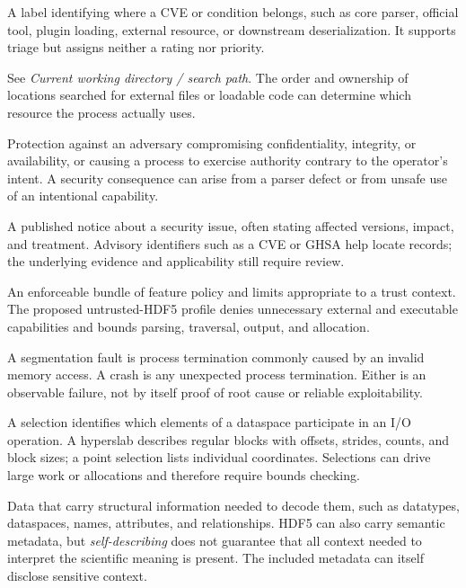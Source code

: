 \documentclass[../main.tex]{subfiles}
\begin{document}
\begin{description}[leftmargin=1.5em,style=nextline]
\item[Scope tag.]
A label identifying where a CVE or condition belongs, such as core parser,
official tool, plugin loading, external resource, or downstream
deserialization. It supports triage but assigns neither a rating nor priority.

\item[Search path.]
See \emph{Current working directory / search path}. The order and ownership of
locations searched for external files or loadable code can determine which
resource the process actually uses.

\item[Security.]
Protection against an adversary compromising confidentiality, integrity, or
availability, or causing a process to exercise authority contrary to the
operator's intent. A security consequence can arise from a parser defect or
from unsafe use of an intentional capability.

\item[Security advisory.]
A published notice about a security issue, often stating affected versions,
impact, and treatment. Advisory identifiers such as a CVE or GHSA help locate
records; the underlying evidence and applicability still require review.

\item[Security profile.]
An enforceable bundle of feature policy and limits appropriate to a trust
context. The proposed untrusted-HDF5 profile denies unnecessary external and
executable capabilities and bounds parsing, traversal, output, and allocation.

\item[Segmentation fault / crash.]
A segmentation fault is process termination commonly caused by an invalid
memory access. A crash is any unexpected process termination. Either is an
observable failure, not by itself proof of root cause or reliable
exploitability.

\item[Selection / hyperslab / point selection.]
A selection identifies which elements of a dataspace participate in an I/O
operation. A hyperslab describes regular blocks with offsets, strides, counts,
and block sizes; a point selection lists individual coordinates. Selections
can drive large work or allocations and therefore require bounds checking.

\item[Self-describing data.]
Data that carry structural information needed to decode them, such as
data\-types, data\-spaces, names, attributes, and relationships. HDF5 can also
carry semantic metadata, but \emph{self-describing} does not guarantee that all
context needed to interpret the scientific meaning is present. The included
metadata can itself disclose sensitive context.


\end{description}
\end{document}
